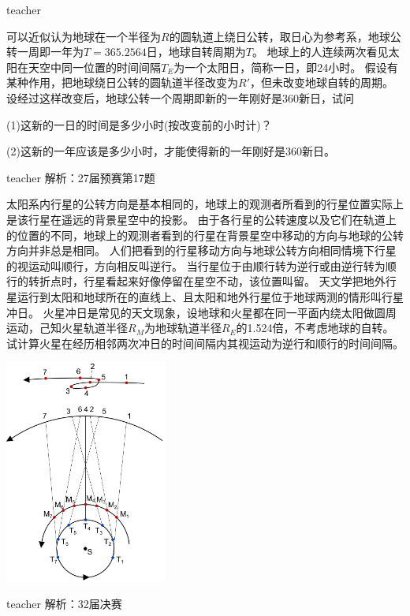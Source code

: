 \begin{example}
\begin{taggedblock}{teacher}
\end{taggedblock}
\end{example}


\begin{example}
可以近似认为地球在一个半径为$R$的圆轨道上绕日公转，取日心为参考系，地球公转一周即一年为$T=365.2564$日，地球自转周期为$T$。
地球上的人连续两次看见太阳在天空中同一位置的时间间隔$T_E$为一个太阳日，简称一日，即24小时。
假设有某种作用，把地球绕日公转的圆轨道半径改变为$R'$，但未改变地球自转的周期。
设经过这样改变后，地球公转一个周期即新的一年刚好是360新日，试问

(1)这新的一日的时间是多少小时(按改变前的小时计)？

(2)这新的一年应该是多少小时，才能使得新的一年刚好是360新日。
\begin{taggedblock}{teacher}
\newline
解析：27届预赛第17题
\end{taggedblock}
\end{example}


\begin{example}
太阳系内行星的公转方向是基本相同的，地球上的观测者所看到的行星位置实际上是该行星在遥远的背景星空中的投影。
由于各行星的公转速度以及它们在轨道上的位置的不同，地球上的观测者看到的行星在背景星空中移动的方向与地球的公转方向并非总是相同。
人们把看到的行星移动方向与地球公转方向相同情境下行星的视运动叫顺行，方向相反叫逆行。
当行星位于由顺行转为逆行或由逆行转为顺行的转折点时，行星看起来好像停留在星空不动，该位置叫留。
天文学把地外行星运行到太阳和地球所在的直线上、且太阳和地外行星位于地球两测的情形叫行星冲日。
火星冲日是常见的天文现象，设地球和火星都在同一平面内绕太阳做圆周运动，己知火星轨道半径$R_M$为地球轨道半径$R_E$的1.524倍，不考虑地球的自转。
试计算火星在经历相邻两次冲日的时间间隔内其视运动为逆行和顺行的时间间隔。
\begin{flushright}
\includegraphics[width=0.4\textwidth]{images/Mars_retrograde_motion.pdf}
\end{flushright}
\begin{taggedblock}{teacher}
\noindent
解析：32届决赛
\end{taggedblock}
\end{example}

